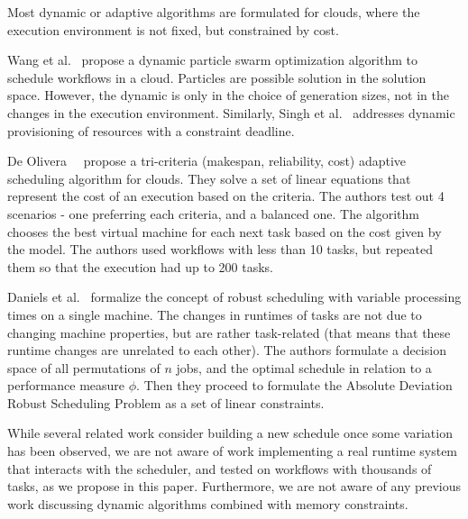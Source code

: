 \documentclass[conference]{IEEEtran}
\newcommand{\AB}[1]{{\color{purple}[AB: #1]}}
\begin{document}
    Most dynamic or adaptive algorithms are formulated for clouds, where the execution environment is not fixed,
    but constrained by cost.

    Wang et al.~\cite{wang2019dynamic} propose a dynamic particle swarm optimization algorithm to schedule workflows in a cloud.
    Particles are possible solution in the solution space.
    However, the dynamic is only in the choice of generation sizes, not in the changes in the execution environment.
    Similarly, Singh et al.~\cite{singh2018novel} addresses dynamic provisioning of resources with a constraint deadline.

    De Olivera~\etal~\cite{de2012provenance} propose a tri-criteria (makespan, reliability, cost) adaptive scheduling algorithm
    for clouds.
    They solve a set of linear equations that represent the cost of an execution based on the criteria.
    The authors test out 4 scenarios - one preferring each criteria, and a balanced one.
    The algorithm chooses the best virtual machine for each next task based on the cost given by the model.
    The authors used workflows with less than 10 tasks, but repeated them so that the execution had up to 200 tasks.


    Daniels et al.~\cite{daniels1995robust} formalize the concept of robust scheduling with variable processing times
    on a single machine.
    The changes in runtimes of tasks are not due to changing machine properties, but are rather task-related (that means
    that these runtime changes are unrelated to each other).
    The authors formulate a decision space of all permutations of $n$ jobs, and the optimal schedule in relation to a
    performance measure $\phi$.
    Then they proceed to formulate the Absolute Deviation Robust Scheduling Problem as a set of linear constraints.

While several related work consider building a new schedule once some variation has been observed,
we are not aware of work implementing a real runtime system that interacts with the scheduler,
and tested on workflows with thousands of tasks, as we propose in this paper. Furthermore, 
we are not aware of any previous work discussing dynamic algorithms combined with memory constraints. 
\end{document}
